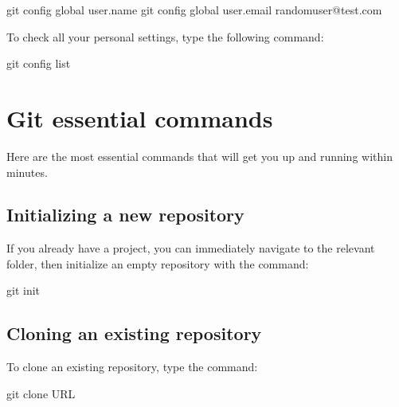 \documentclass[a4paper,10pt,english,openany,oneside]{sphinxmanual}
\begin{document}
\begin{sphinxVerbatim}[commandchars=\\\{\}]
git config \PYGZhy{}\PYGZhy{}global user.name 
git config \PYGZhy{}\PYGZhy{}global user.email randomuser@test.com
\end{sphinxVerbatim}

\sphinxAtStartPar
To check all your personal settings, type the following command:

\begin{sphinxVerbatim}[commandchars=\\\{\}]
git config \PYGZhy{}\PYGZhy{}list
\end{sphinxVerbatim}


\chapter{Git essential commands}
\label{\detokenize{gitinminutes:git-essential-commands}}
\sphinxAtStartPar
Here are the most essential commands that will get you up and running within minutes.


\section{Initializing a new repository}
\label{\detokenize{gitinminutes:initializing-a-new-repository}}
\sphinxAtStartPar
If you already have a project, you can immediately navigate to the relevant folder, then initialize an empty repository with the command:

\begin{sphinxVerbatim}[commandchars=\\\{\}]
git init
\end{sphinxVerbatim}


\section{Cloning an existing repository}
\label{\detokenize{gitinminutes:cloning-an-existing-repository}}
\sphinxAtStartPar
To clone an existing repository, type the command:

\begin{sphinxVerbatim}[commandchars=\\\{\}]
git clone \PYGZlt{}URL\PYGZgt{}
\end{sphinxVerbatim}
\end{document}
